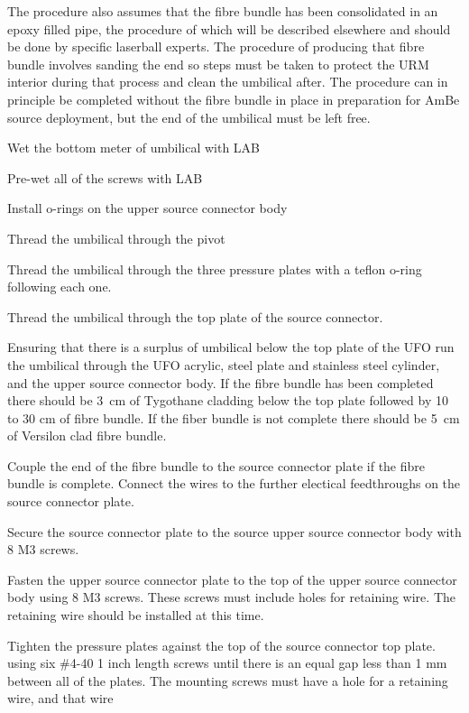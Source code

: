 \documentclass[11pt]{article}
\begin{document}
The procedure also assumes that the fibre bundle has been consolidated
in an epoxy filled pipe, the procedure of which will be described
elsewhere and should be done by specific laserball experts. The
procedure of producing that fibre bundle involves sanding the end so
steps must be taken to protect the URM interior during that process
and clean the umbilical after. The procedure can in principle be
completed without the fibre bundle in place in preparation for AmBe
source deployment, but the end of the umbilical must be left free.

\begin{answerlist}
\item Wet the bottom meter of umbilical with LAB
\item Pre-wet all of the screws with LAB
\item Install o-rings on the upper source connector body 
\item Thread the umbilical through the pivot
\item Thread the umbilical through the three pressure plates with a teflon o-ring following each one.
\item Thread the umbilical through the top plate of the source connector.
\item Ensuring that there is a surplus of umbilical below the top
  plate of the UFO run the umbilical through the UFO acrylic, steel plate and
  stainless steel cylinder, and the upper source connector body. If the fibre bundle has been completed there should be 3~cm of Tygothane cladding below the top plate followed by 10 to 30 cm of fibre bundle. If the fiber bundle is not complete there should be 5~cm of Versilon clad fibre bundle.
\item Couple the end of the fibre bundle to the source connector plate if the fibre bundle is complete. Connect the wires to the further electical feedthroughs on the source connector plate. 
\item Secure the source connector plate to the source upper source
  connector body with 8 M3 screws.
\item Fasten the upper source connector plate to the top of the upper source connector body using 8 M3 screws. These screws must include holes for retaining wire. The retaining wire should be installed at this time.
\item Tighten the pressure plates against the top of the source
  connector top plate.  using six \#4-40 1 inch length screws until
  there is an equal gap less than 1 mm between all of the plates. The
  mounting screws must have a hole for a retaining wire, and that wire

\end{answerlist}
\end{document}
